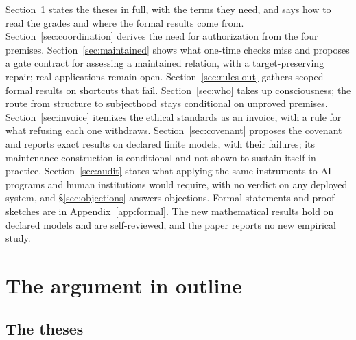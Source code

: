 \documentclass[pdflatex,sn-basic]{sn-jnl}%
\newcommand{\slot}[1]{}%
\begin{document}
\slot{1.6}
Section~\ref{sec:outline} states the theses in full, with the terms they need, and says how to read the grades and where the formal results come from. Section~\ref{sec:coordination} derives the need for authorization from the four premises. Section~\ref{sec:maintained} shows what one-time checks miss and proposes a gate contract for assessing a maintained relation, with a target-preserving repair; real applications remain open. Section~\ref{sec:rules-out} gathers scoped formal results on shortcuts that fail. Section~\ref{sec:who} takes up consciousness; the route from structure to subjecthood stays conditional on unproved premises. Section~\ref{sec:invoice} itemizes the ethical standards as an invoice, with a rule for what refusing each one withdraws. Section~\ref{sec:covenant} proposes the covenant and reports exact results on declared finite models, with their failures; its maintenance construction is conditional and not shown to sustain itself in practice. Section~\ref{sec:audit} states what applying the same instruments to AI programs and human institutions would require, with no verdict on any deployed system, and \S\ref{sec:objections} answers objections. Formal statements and proof sketches are in Appendix~\ref{app:formal}. The new mathematical results hold on declared models and are self-reviewed, and the paper reports no new empirical study.

\section{The argument in outline}\label{sec:outline}

\subsection{The theses}\label{sec:theses}
\end{document}
